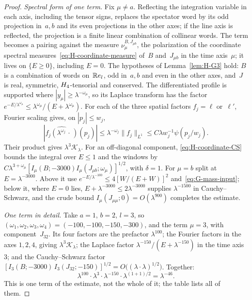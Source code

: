\begin{proof}
\emph{Spectral form of one term.} Fix $\mu\ne a$. Reflecting the integration variable in each axis, including the tensor signs, replaces the spectator word by its odd projection in~$a,b$ and its even projections in the other axes; if the line axis is reflected, the projection is a finite linear combination of collinear words. The term becomes a pairing against the measure $\nu_\mu^{B,J_{\mu b}}$, the polarization of the coordinate spectral measures~\eqref{eq:H-coordinate-measure} of~$B$ and~$J_{\mu b}$ in the time axis~$\mu$; it lives on $\{E\ge0\}$, including $E=0$. The hypotheses of Lemma~\ref{lem:H-G3} hold: $B$ is a combination of words on~$\mathbb{R} e_l$, odd in~$a,b$ and even in the other axes, and~$J$ is real, symmetric, $H_4$-tensorial and conserved. The differentiated profile is supported where $|y_\mu|\ge\lambda^{-\omega_\mu}$, so its Laplace transform has the factor $e^{-E/\lambda^{\omega_\mu}}\le\lambda^{\omega_\mu}/(E+\lambda^{\omega_\mu})$. For each of the three spatial factors $f_j=\ell$ or~$\ell'$, Fourier scaling gives, on $|p_j|\le w_j$,
\begin{equation*}
|\widehat{f_j(\lambda^{\omega_j}\,\cdot\,)}(p_j)|
\le\lambda^{-\omega_j}\|f_j\|_{L^1}
\le C\lambda w_j^{-1}\psi(p_j/w_j).
\end{equation*}
Their product gives $\lambda^3\mathcal K_\lambda$. For an off-diagonal component, \eqref{eq:H-coordinate-CS} bounds the integral over $E\le1$ and the windows by $C\lambda^{3+\omega_\mu}[I_\mu(B;-3000)I_\mu(J_{\mu b};\omega_\mu)]^{1/2}$, with $\delta=1$. For $\mu=b$ split at $E=\lambda^{-3000}$. Above it use $e^{-E/\lambda^{-100}}\le4[W/(E+W)]^2$ and~\eqref{eq:G-mass-input}; below it, where $E=0$ lies, $E+\lambda^{-3000}\le2\lambda^{-3000}$ supplies $\lambda^{-1500}$ in Cauchy--Schwarz, and the crude bound $I_\mu(J_{\mu\mu};0)=O(\lambda^{900})$ completes the estimate.

\emph{One term in detail.} Take $a=1$, $b=2$, $l=3$, so $(\omega_1,\omega_2,\omega_3,\omega_4)=(-100,-100,-150,-300)$, and the term $\mu=3$, with component~$J_{32}$. Its four factors are the prefactor $\lambda^{100}$; the Fourier factors in the axes $1,2,4$, giving $\lambda^3\mathcal K_\lambda$; the Laplace factor $\lambda^{-150}/(E+\lambda^{-150})$ in the time axis~$3$; and the Cauchy--Schwarz factor $[I_3(B;-3000)\,I_3(J_{32};-150)]^{1/2}=O\bigl((\lambda\cdot\lambda)^{1/2}\bigr)$. Together:
\begin{equation*}
\lambda^{100}\cdot\lambda^{3}\cdot\lambda^{-150}\cdot\lambda^{(1+1)/2}=\lambda^{-46}.
\end{equation*}
This is one term of the estimate, not the whole of it; the table lists all of them.


\end{proof}
